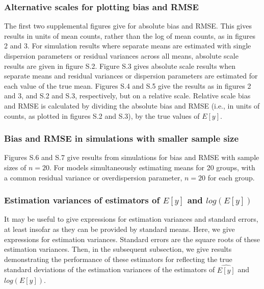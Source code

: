 \documentclass[]{article}
\begin{document}
\subsubsection{Alternative scales for plotting bias and
RMSE}\label{alternative-scales-for-plotting-bias-and-rmse}

The first two supplemental figures give for absolute bias and RMSE. This
gives results in units of mean counts, rather than the log of mean
counts, as in figures 2 and 3. For simulation results where separate
means are estimated with single dispersion parameters or residual
variances across all means, absolute scale results are given in figure
S.2. Figure S.3 gives absolute scale results when separate means and
residual variances or dispersion parameters are estimated for each value
of the true mean. Figures S.4 and S.5 give the results as in figures 2
and 3, and S.2 and S.3, respectively, but on a relative scale. Relative
scale bias and RMSE is calculated by dividing the absolute bias and RMSE
(i.e., in units of counts, as plotted in figures S.2 and S.3), by the
true values of \(E[y]\).

\subsubsection{Bias and RMSE in simulations with smaller sample
size}\label{bias-and-rmse-in-simulations-with-smaller-sample-size}

Figures S.6 and S.7 give results from simulations for bias and RMSE with
sample sizes of \(n = 20\). For models simultaneously estimating means
for 20 groups, with a common residual variance or overdispersion
parameter, \(n = 20\) for each group.

\subsubsection{\texorpdfstring{Estimation variances of estimators of
\(E[y]\) and
\(log(E[y])\)}{Estimation variances of estimators of E{[}y{]} and log(E{[}y{]})}}\label{estimation-variances-of-estimators-of-ey-and-logey}

It may be useful to give expressions for estimation variances and
standard errors, at least insofar as they can be provided by standard
means. Here, we give expressions for estimation variances. Standard
errors are the square roots of these estimation variances. Then, in the
subsequent subsection, we give results demonstrating the performance of
these estimators for reflecting the true standard deviations of the
estimation variances of the estimators of \(\widehat{E[y]}\) and
\(\widehat{log(E[y])}\).
\end{document}
